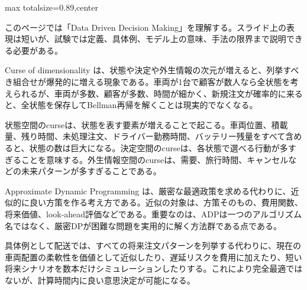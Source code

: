 \begin{minipage}[t]{0.58\textwidth}
\begin{adjustbox}{max totalsize={\textwidth}{0.89\textheight},center}
\begin{minipage}{\textwidth}\scriptsize
{}このページでは「Data Driven Decision Making」を理解する。スライド上の表現は短いが、試験では定義、具体例、モデル上の意味、手法の限界まで説明できる必要がある。\par
Curse of dimensionality は、状態や決定や外生情報の次元が増えると、列挙すべき組合せが爆発的に増える現象である。車両が1台で顧客が数人なら全状態を考えられるが、車両が多数、顧客が多数、時間が細かく、新規注文が確率的に来ると、全状態を保存してBellman再帰を解くことは現実的でなくなる。\par
状態空間のcurseは、状態を表す要素が増えることで起こる。車両位置、積載量、残り時間、未処理注文、ドライバー勤務時間、バッテリー残量をすべて含めると、状態の数は巨大になる。決定空間のcurseは、各状態で選べる行動が多すぎることを意味する。外生情報空間のcurseは、需要、旅行時間、キャンセルなどの未来パターンが多すぎることである。\par
Approximate Dynamic Programming は、厳密な最適政策を求める代わりに、近似的に良い方策を作る考え方である。近似の対象は、方策そのもの、費用関数、将来価値、look-ahead評価などである。重要なのは、ADPは一つのアルゴリズム名ではなく、厳密DPが困難な問題を実用的に解く方法群である点である。\par
具体例として配送では、すべての将来注文パターンを列挙する代わりに、現在の車両配置の柔軟性を価値として近似したり、遅延リスクを費用に加えたり、短い将来シナリオを数本だけシミュレーションしたりする。これにより完全最適ではないが、計算時間内に良い意思決定が可能になる。\par

\end{minipage}
\end{adjustbox}
\end{minipage}
